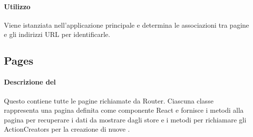 \paragraph*{Utilizzo}
Viene istanziata nell'applicazione principale e determina le associazioni tra pagine e gli indirizzi URL per identificarle.

\subsection{Pages}
\paragraph*{Descrizione del }
Questo  contiene tutte le pagine richiamate da Router. Ciascuna classe rappresenta una pagina definita come componente React e fornisce i metodi alla pagina per recuperare i dati da mostrare dagli store e i metodi per richiamare gli ActionCreators per la creazione di nuove .
